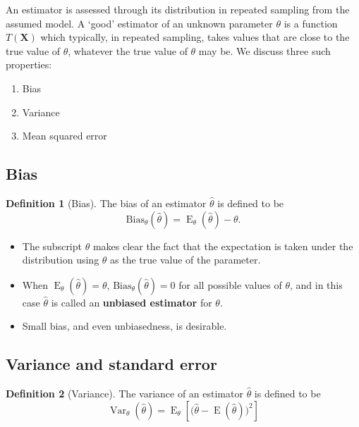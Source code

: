 \documentclass[
]{book}
\providecommand{\tightlist}{%
  \setlength{\itemsep}{0pt}\setlength{\parskip}{0pt}}
\newcommand{\bX}{{\boldsymbol X}}
\DeclareMathOperator{\E}{E}
\DeclareMathOperator{\Var}{Var}
\theoremstyle{definition}
\newtheorem{definition}{Definition}[chapter]
\theoremstyle{definition}
\theoremstyle{definition}
\theoremstyle{definition}
\theoremstyle{remark}
\begin{document}
An estimator is assessed through its distribution in repeated sampling from the assumed model.
A `good' estimator of an unknown parameter \(\theta\) is a function \(T(\bX)\) which typically, in repeated sampling, takes values that are close to the true value of \(\theta\), whatever the true value of \(\theta\) may be.
We discuss three such properties:

\begin{enumerate}
\def\labelenumi{\arabic{enumi}.}
\tightlist
\item
  Bias
\item
  Variance
\item
  Mean squared error
\end{enumerate}

\hypertarget{bias}{%
\subsection{Bias}\label{bias}}

\begin{definition}[Bias]
The bias of an estimator \(\hat\theta\) is defined to be
\[\text{Bias}_\theta(\hat\theta) = \E_\theta(\hat\theta) - \theta.\]
\end{definition}

\begin{itemize}
\tightlist
\item
  The subscript \(\theta\) makes clear the fact that the expectation is taken under the distribution using \(\theta\) as the true value of the parameter.
\item
  When \(\E_\theta(\hat\theta) = \theta\),
  \(\text{Bias}_\theta(\hat\theta)=0\) for all possible values of \(\theta\),
  and in this case \(\hat\theta\) is called an \textbf{unbiased estimator} for \(\theta\).
\item
  Small bias, and even unbiasedness, is desirable.
\end{itemize}

\hypertarget{variance-and-standard-error}{%
\subsection{Variance and standard error}\label{variance-and-standard-error}}

\begin{definition}[Variance]
The variance of an estimator \(\hat\theta\) is defined to be
\[\Var_{\theta}(\hat\theta)=\E_\theta\left[\big(\hat\theta - \E(\hat\theta)\big)^2\right]\]
\end{definition}
\end{document}

